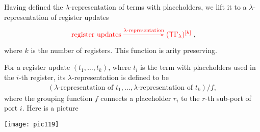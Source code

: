 
Having defined the $\lambda$-representation of terms with placeholders, we lift it to a $\lambda$-representation of  register updates
\begin{align}\label{eq:lambda-representation-regup}
\ranked{
    \xymatrix@C=2cm{
 \text{register updates}    \ar[r]^-{\text{$\lambda$-representation}} &
 \mati k {(\tmonad\Gamma_\lambda)}
}
},
\end{align}
where $k$ is the number of registers. This function is arity preserving. 

For a register update $(t_1,\ldots,t_k)$, where $t_i$ is the term with placeholders used in the $i$-th register,  its $\lambda$-representation is defined to be 
\begin{align*}
(\text{$\lambda$-representation of $t_1$},\ldots,\text{$\lambda$-representation of $t_k$})/f ,
\end{align*}
 where the grouping function $f$ connects a placeholder $r_i$ to the $r$-th sub-port of port $i$. 
Here is a picture
\begin{center}
\texttt{[image: pic119]}
\end{center}


